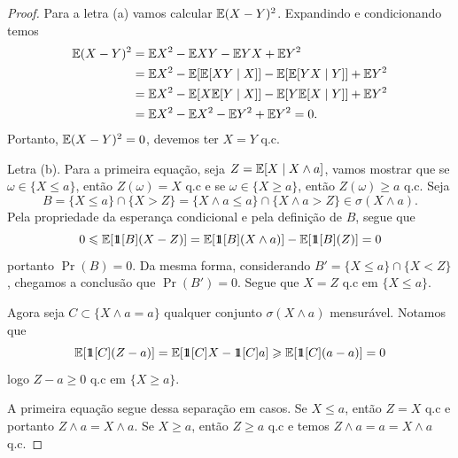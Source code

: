 \begin{proof}
	Para a letra (a) vamos calcular $\mathbb{E} (X - Y)^2$. Expandindo e
	condicionando temos
	\begin{align*}
		\mathbb{E}(X - Y)^2 &= \mathbb{E} X^2 - \mathbb{E} XY - \mathbb{E} YX + \mathbb{E} Y^2\\
		&= \mathbb{E} X^2 - \mathbb{E}[\mathbb{E}[XY \mid X]] - \mathbb{E}[\mathbb{E}[YX \mid Y]] + \mathbb{E} Y^2\\
		&= \mathbb{E} X^2 - \mathbb{E}[X\mathbb{E}[Y \mid X]] - \mathbb{E}[Y\mathbb{E}[X \mid Y]] + \mathbb{E} Y^2\\
		&= \mathbb{E} X^2 - \mathbb{E} X^2 - \mathbb{E} Y^2 + \mathbb{E} Y^2 = 0.
	\end{align*}
	Portanto, $\mathbb{E}(X - Y)^2 = 0$, devemos ter $X = Y$ q.c.

	Letra (b). Para a primeira equação, seja $Z = \mathbb{E}[X \mid X \land a]$, vamos
	mostrar que se $\omega \in \{X \leq a\}$, então $Z(\omega) = X$ q.c e
	se $\omega \in \{X \geq a\}$, então $Z(\omega) \geq a$ q.c. Seja
	\[B = \{X \leq a\} \cap \{X > Z\} = \{X \land a \leq a\} \cap \{X
	\land a > Z\} \in \sigma(X \land a).\]
	Pela propriedade da esperança condicional e pela definição de $B$, segue que
	\[
		0 \leqslant \mathbb{E}[\hbox{$1\mkern-6.5mu1$}[B](X - Z)] = \mathbb{E}[\hbox{$1\mkern-6.5mu1$}[B](X \land a)] - \mathbb{E}[\hbox{$1\mkern-6.5mu1$}[B](Z)] = 0
	\]
	portanto $\Pr(B) = 0$. Da mesma forma, considerando $B' = \{X \leq
	a\} \cap \{X < Z\}$, chegamos a conclusão que $\Pr(B') = 0$. Segue
	que $X = Z$ q.c em $\{X \leq a\}$.

	Agora seja $C \subset \{X \land a = a\}$ qualquer conjunto $\sigma(X
	\land a)$ mensurável. Notamos que
	\[
		\mathbb{E}[\hbox{$1\mkern-6.5mu1$}[C](Z - a)] = \mathbb{E}[\hbox{$1\mkern-6.5mu1$}[C]X - \hbox{$1\mkern-6.5mu1$}[C]a] \geqslant \mathbb{E}[\hbox{$1\mkern-6.5mu1$}[C](a - a)] = 0
	\]
	logo $Z - a \geq 0$ q.c em $\{X \geq a\}$.

	A primeira equação segue dessa separação em casos. Se $X \leq a$,
	então $Z = X$ q.c e portanto $Z \land a = X \land a$. Se $X \geq a$,
	então $Z \geq a$ q.c
	e temos $Z \land a = a = X \land a$ q.c.


\end{proof}
